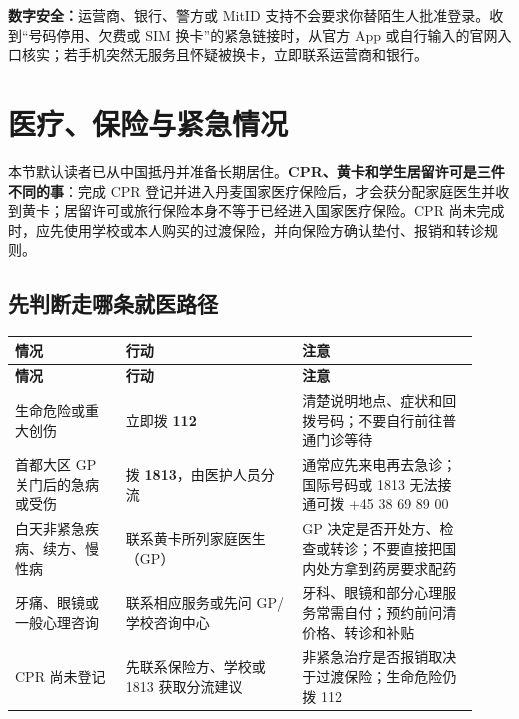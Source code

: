 \begin{grayleftbox}
\textbf{数字安全：}运营商、银行、警方或 MitID 支持不会要求你替陌生人批准登录。收到“号码停用、欠费或 SIM 换卡”的紧急链接时，从官方 App 或自行输入的官网入口核实；若手机突然无服务且怀疑被换卡，立即联系运营商和银行。
\end{grayleftbox}


\section{医疗、保险与紧急情况}\label{sec:health}

本节默认读者已从中国抵丹并准备长期居住。\textbf{CPR、黄卡和学生居留许可是三件不同的事}：完成 CPR 登记并进入丹麦国家医疗保险后，才会获分配家庭医生并收到黄卡；居留许可或旅行保险本身不等于已经进入国家医疗保险。CPR 尚未完成时，应先使用学校或本人购买的过渡保险，并向保险方确认垫付、报销和转诊规则。

\subsection{先判断走哪条就医路径}

\small
{}
\begin{longtable}{p{0.22\linewidth}p{0.35\linewidth}p{0.35\linewidth}}
  \toprule
  \textbf{情况} & \textbf{行动} & \textbf{注意} \\
  \midrule
  \endfirsthead
  \toprule
  \textbf{情况} & \textbf{行动} & \textbf{注意} \\
  \midrule
  \endhead
  \bottomrule
  \endfoot
  生命危险或重大创伤 & 立即拨 \textbf{112} & 清楚说明地点、症状和回拨号码；不要自行前往普通门诊等待 \\
  首都大区 GP 关门后的急病或受伤 & 拨 \textbf{1813}，由医护人员分流 & 通常应先来电再去急诊；国际号码或 1813 无法接通可拨 +45 38 69 89 00 \\
  白天非紧急疾病、续方、慢性病 & 联系黄卡所列家庭医生（GP） & GP 决定是否开处方、检查或转诊；不要直接把国内处方拿到药房要求配药 \\
  牙痛、眼镜或一般心理咨询 & 联系相应服务或先问 GP/学校咨询中心 & 牙科、眼镜和部分心理服务常需自付；预约前问清价格、转诊和补贴 \\
  CPR 尚未登记 & 先联系保险方、学校或 1813 获取分流建议 & 非紧急治疗是否报销取决于过渡保险；生命危险仍拨 112 \\
\end{longtable}
\normalsize

